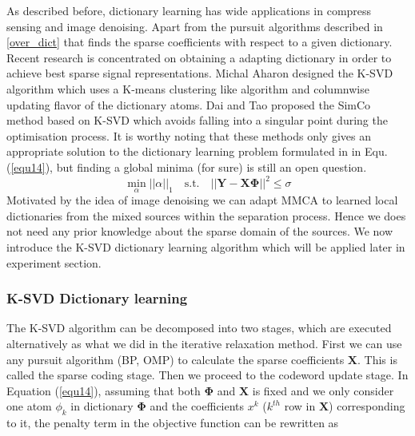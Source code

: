 As described before, dictionary learning has wide applications in compress sensing and image denoising. Apart from the pursuit algorithms described in \ref{over_dict} that finds the sparse coefficients with respect to a given dictionary. Recent research is concentrated on obtaining a adapting dictionary in order to achieve best sparse signal representations. Michal Aharon designed the K-SVD \cite{AharonM2006KAaf} algorithm which uses a K-means clustering like algorithm and columnwise updating flavor of the dictionary atoms. Dai and Tao proposed the SimCo method \cite{6340354} based on K-SVD which avoids falling into a singular point during the optimisation process. It is worthy noting that these methods only gives an appropriate solution to the dictionary learning problem formulated in in Equ.(\ref{equ14}), but finding a global minima (for sure) is still an open question.\\
\begin{equation}
    \min_{\alpha}||\alpha||_1 \quad \text{s.t.} \quad || \mathbf{Y} - \mathbf{X} \mathbf{\Phi}||^2 \leq \sigma
    \label{equ14}
\end{equation}
Motivated by the idea of image denoising we can adapt MMCA to learned local dictionaries from the mixed sources within the separation process\cite{VAbolghasemi2012}. Hence we does not need any prior knowledge about the sparse domain of the sources. We now introduce the K-SVD dictionary learning algorithm which will be applied later in experiment section.\\

\subsubsection{K-SVD Dictionary learning}
The K-SVD algorithm can be decomposed into two stages, which are executed alternatively as what we did in the iterative relaxation method. First we can use any pursuit algorithm (BP, OMP) to calculate the sparse coefficients $\mathbf{X}$. This is called the sparse coding stage. Then we proceed to the codeword update stage. In Equation (\ref{equ14}), assuming that both $\mathbf{\Phi}$ and $\mathbf{X}$ is fixed and we only consider one atom $\phi_k$ in dictionary $\mathbf{\Phi}$ and the coefficients $x^k$ ($k^{th}$ row in $\mathbf{X}$) corresponding to it, the penalty term in the objective function can be rewritten as

